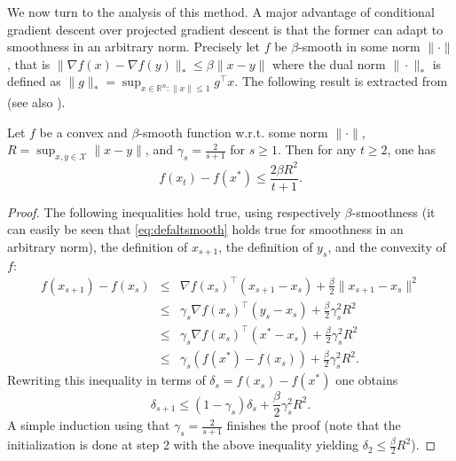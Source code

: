 We now turn to the analysis of this method. A major advantage of conditional gradient descent over projected gradient descent is that the former can adapt to smoothness in an arbitrary norm. Precisely let $f$ be $\beta$-smooth in some norm $\|\cdot\|$, that is $\|\nabla f(x) - \nabla f(y) \|_* \leq \beta \|x-y\|$ where the dual norm $\|\cdot\|_*$ is defined as $\|g\|_* = \sup_{x \in \mathbb{R}^n : \|x\| \leq 1} g^{\top} x$. The following result is extracted from \cite{Jag13} (see also \cite{DH78}).
%

\begin{theorem}
Let $f$ be a convex and $\beta$-smooth function w.r.t. some norm $\|\cdot\|$, $R = \sup_{x, y \in \mathcal{X}} \|x - y\|$, and $\gamma_s = \frac{2}{s+1}$ for $s \geq 1$. Then for any $t \geq 2$, one has
$$f(x_t) - f(x^*) \leq \frac{2 \beta R^2}{t+1} .$$
\end{theorem}

\begin{proof}
The following inequalities hold true, using respectively $\beta$-smoothness (it can easily be seen that \eqref{eq:defaltsmooth} holds true for smoothness in an arbitrary norm), the definition of $x_{s+1}$, the definition of $y_s$, and the convexity of $f$:
\begin{eqnarray*}
f(x_{s+1}) - f(x_s) & \leq & \nabla f(x_s)^{\top} (x_{s+1} - x_s) + \frac{\beta}{2} \|x_{s+1} - x_s\|^2 \\
& \leq & \gamma_s \nabla f(x_s)^{\top} (y_{s} - x_s) + \frac{\beta}{2} \gamma_s^2 R^2 \\
& \leq & \gamma_s \nabla f(x_s)^{\top} (x^* - x_s) + \frac{\beta}{2} \gamma_s^2 R^2 \\
& \leq & \gamma_s (f(x^*) - f(x_s)) + \frac{\beta}{2} \gamma_s^2 R^2 .
\end{eqnarray*}
Rewriting this inequality in terms of $\delta_s = f(x_s) - f(x^*)$ one obtains
$$\delta_{s+1} \leq (1 - \gamma_s) \delta_s + \frac{\beta}{2} \gamma_s^2 R^2 .$$
A simple induction using that $\gamma_s = \frac{2}{s+1}$ finishes the proof (note that the initialization is done at step $2$ with the above inequality yielding $\delta_2 \leq \frac{\beta}{2} R^2$).
\end{proof}

